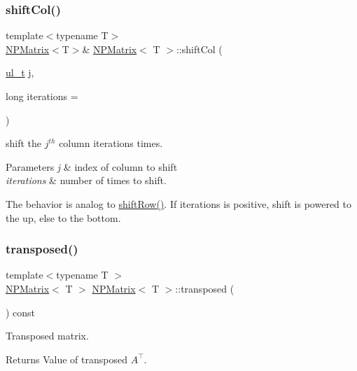 \subsubsection{\texorpdfstring{shiftCol()}{shiftCol()}}
{\footnotesize\ttfamily template$<$typename T$>$ \\
\mbox{\hyperlink{class_n_p_matrix}{N\+P\+Matrix}}$<$T$>$\& \mbox{\hyperlink{class_n_p_matrix}{N\+P\+Matrix}}$<$ T $>$\+::shift\+Col (\begin{DoxyParamCaption}\item[{\mbox{\hyperlink{group___n_algebra_ga1b140a2034db3f5dfe18a987745df43a}{ul\+\_\+t}}}]{j,  }\item[{long}]{iterations = {} }\end{DoxyParamCaption})\hspace{0.3cm}{\ttfamily [inline]}}



shift the $ j^{th} $ column {\ttfamily iterations} times. 


\begin{DoxyParams}{Parameters}
{\em j} & index of column to shift \\
\hline
{\em iterations} & number of times to shift.\\
\hline
\end{DoxyParams}
The behavior is analog to {\ttfamily \mbox{\hyperlink{class_n_p_matrix_a8927e2dc64af30c6f619a93678332093}{shift\+Row()}}}. If {\ttfamily iterations} is positive, shift is powered to the up, else to the bottom. \mbox{\label{class_n_p_matrix_abb4f410d97dc7e89798c67112c1e1bd3}} 
\subsubsection{\texorpdfstring{transposed()}{transposed()}}
{\footnotesize\ttfamily template$<$typename T $>$ \\
\mbox{\hyperlink{class_n_p_matrix}{N\+P\+Matrix}}$<$ T $>$ \mbox{\hyperlink{class_n_p_matrix}{N\+P\+Matrix}}$<$ T $>$\+::transposed (\begin{DoxyParamCaption}{ }\end{DoxyParamCaption}) const}



Transposed matrix. 

\begin{DoxyReturn}{Returns}
Value of transposed $ A^\top $. 
\end{DoxyReturn}
\mbox{\label{class_n_p_matrix_a007a87743223b6dddaa3ec8e44489ffb}} 

